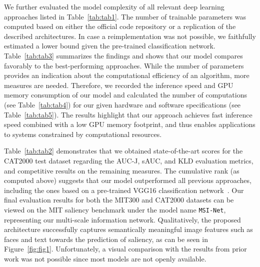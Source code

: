 \documentclass[final,1p,times,number]{elsarticle}
\begin{document}
We further evaluated the model complexity of all relevant deep learning approaches listed in Table~\ref{tab:tab1}. The number of trainable parameters was computed based on either the official code repository or a replication of the described architectures. In case a reimplementation was not possible, we faithfully estimated a lower bound given the pre-trained classification network. Table~\ref{tab:tab3} summarizes the findings and shows that our model compares favorably to the best-performing approaches. While the number of parameters provides an indication about the computational efficiency of an algorithm, more measures are needed. Therefore, we recorded the inference speed and GPU memory consumption of our model and calculated the number of computations (see Table~\ref{tab:tab4}) for our given hardware and software specifications (see Table~\ref{tab:tab5}). The results highlight that our approach achieves fast inference speed combined with a low GPU memory footprint, and thus enables applications to systems constrained by computational resources.

Table~\ref{tab:tab2} demonstrates that we obtained state-of-the-art scores for the CAT2000 test dataset regarding the AUC-J, sAUC, and KLD evaluation metrics, and competitive results on the remaining measures. The cumulative rank (as computed above) suggests that our model outperformed all previous approaches, including the ones based on a pre-trained VGG16 classification network~\citep{Cornia2018PredictingHE,kruthiventi2017deepfix}. Our final evaluation results for both the MIT300 and CAT2000 datasets can be viewed on the MIT saliency benchmark under the model name \texttt{MSI-Net}, representing our multi-scale information network. Qualitatively, the proposed architecture successfully captures semantically meaningful image features such as faces and text towards the prediction of saliency, as can be seen in Figure~\ref{fig:fig1}. Unfortunately, a visual comparison with the results from prior work was not possible since most models are not openly available.
\end{document}
